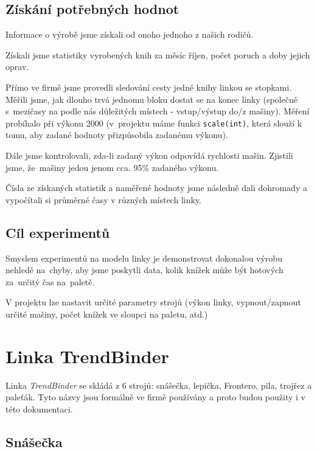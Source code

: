 \documentclass[a4paper, 11pt]{article}
\begin{document}
\subsection{Získání potřebných hodnot}

Informace o výrobě jsme získali od onoho jednoho z našich rodičů. 

Získali jsme statistiky vyrobených knih za měsíc říjen, počet poruch a doby jejich oprav.\smallskip

Přímo ve firmě jsme provedli sledování cesty jedné knihy linkou se stopkami. Měřili jsme, jak dlouho trvá jednomu bloku dostat se na konec linky (společně s~mezičasy na podle nás důležitých místech - vstup/výstup do/z mašiny). Měření probíhalo při výkonu 2000 (v~projektu máme funkci \texttt{scale(int)}, která slouží k tomu, aby zadané hodnoty přizpůsobila zadanému výkonu).\smallskip

Dále jsme kontrolovali, zda-li zadaný výkon odpovídá rychlosti mašin. Zjistili jsme, že~mašiny jedou jenom cca. 95\% zadaného výkonu.\smallskip

Čísla ze získaných statistik a naměřené hodnoty jsme následně dali dohromady a vypočítali si průměrné časy v různých místech linky.

\subsection{Cíl experimentů}

Smyslem experimentů na modelu linky je demonstrovat dokonalou výrobu nehledě na~chyby, aby jsme poskytli data, kolik knížek může být hotových za~určitý čas na~paletě.

V projektu lze nastavit určité parametry strojů (výkon linky, vypnout/zapnout určité mašiny, počet knížek ve sloupci na paletu, atd.)

\pagebreak

\section{Linka TrendBinder}

Linka \emph{TrendBinder} se skládá z 6 strojů: snášečka, lepička, Frontero, pila, trojřez a paleťák. Tyto názvy jsou formálně ve firmě používány a proto budou použity i v této dokumentaci. 

\subsection{Snášečka}
\end{document}
